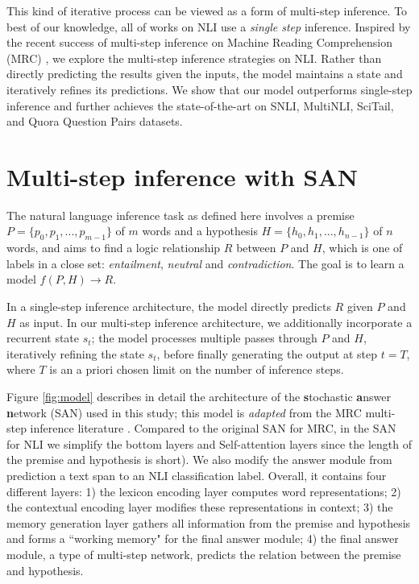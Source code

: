 \documentclass[11pt,a4paper]{article}
\newcommand\MIN{SAN}
\begin{document}
This kind of iterative process can be viewed as a form of multi-step inference. To best of our knowledge, all of works on NLI use a \textit{single step} inference. Inspired by the recent success of multi-step inference on Machine Reading Comprehension (MRC) \cite{hill2015goldilocks,dhingra2016gated,sordoni2016iterative,kumar15askme, liu18san, shen2017empirical,xu2018multi}, we explore the multi-step inference strategies on NLI.
Rather than directly predicting the results given the inputs, the model maintains a state and iteratively refines its predictions.
We show that our model outperforms single-step inference and further achieves the state-of-the-art on SNLI, MultiNLI, SciTail, and Quora Question Pairs datasets. \section{Multi-step inference with SAN}
\label{sec:model}
\vspace{-0.1cm}
The natural language inference task as defined here involves a premise $P=\{p_0, p_1, ..., p_{m-1}\}$ of $m$ words and a hypothesis $H=\{h_0, h_1, ..., h_{n-1}\}$ of $n$ words,
and aims to find a logic relationship $R$ between $P$ and $H$, which is one of labels in a close set: \textit{entailment}, \textit{neutral} and \textit{contradiction}. 
The goal is to learn a model $f(P, H) \rightarrow R$. 


In a single-step inference architecture, the model directly predicts $R$ given $P$ and $H$ as input. 
In our multi-step inference architecture, we additionally incorporate a recurrent state $s_t$; the model processes multiple passes through $P$ and $H$, iteratively refining the state $s_t$, before finally generating the output at step $t=T$, where $T$ is an a priori chosen limit on the number of inference steps. 


\begin{figure*}[h!]
\centering
{}
\caption{\label{fig:model} {Architecture of the Stochastic Answer Network ({\MIN}) for Natural Language Inference.}}
\end{figure*}

Figure \ref{fig:model} describes in detail the architecture of the \textbf{s}tochastic \textbf{a}nswer \textbf{n}etwork (SAN) used in this study; this model is \textit{adapted} from the MRC multi-step inference literature \cite{liu18san}. Compared to the original SAN for MRC, in the SAN for NLI we simplify the bottom layers and Self-attention layers since the length of the premise and hypothesis is short). We also modify the answer module from prediction a text span to an NLI classification label.  
Overall, it contains four different layers:
1) the lexicon encoding layer computes word representations; 
2) the contextual encoding layer modifies these representations in context; 
3) the memory generation layer gathers all information from the premise and hypothesis and forms a ``working memory" for the final answer module; 
4) the final answer module, a type of multi-step network, predicts the relation between the premise and hypothesis. 
\end{document}
